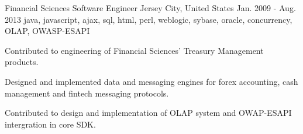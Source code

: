 \cventry
    {Financial Sciences} %
    {Software Engineer} %
    {Jersey City, United States} %
    {Jan. 2009 - Aug. 2013} %
    {java, javascript, ajax, sql, html, perl, weblogic, sybase, oracle, concurrency, OLAP, OWASP-ESAPI} %
    {
        Contributed to engineering of Financial Sciences' Treasury Management products.
    \begin{cvitems} %
        \item { Designed and implemented data and messaging engines for forex accounting, cash management and fintech messaging protocols.}
        \item { Contributed to design and implementation of OLAP system and OWAP-ESAPI intergration in core SDK. }
    \end{cvitems}
    }
    